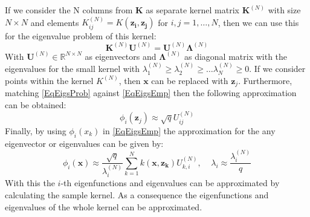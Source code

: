 If we consider the N columns from $\mathbf{K}$ as separate kernel matrix $\mathbf{K}^{(N)}$ with size $N\times N$ and elements $K_{ij}^{(N)}=K(\mathbf{z_i,z_j})$ for $i,j=1,\dots,N$, then we can use this for the eigenvalue problem of this kernel:\cite{Williams.2000}
\begin{equation}\label{EqEigsProb}
	\mathbf{K}^{(N)}\mathbf{U}^{(N)} = \mathbf{U}^{(N)}\mathbf{\Lambda}^{(N)}
\end{equation} 
With $\mathbf{U}^{(N)} \in \mathbb{R}^{N\times N}$ as eigenvectors and $\boldsymbol{\Lambda}^{(N)}$ as diagonal matrix with the eigenvalues for the small kernel with $\lambda_1^{(N)}\ge\lambda_2^{(N)}\ge\dots\lambda_N^{(N)} \ge0$.
If we consider points within the kernel $K^{(N)}$, then $\mathbf{x}$ can be replaced with $\mathbf{z}_j$.
Furthermore, matching \eqref{EqEigsProb} against \eqref{EqEigsEmp} then the following approximation can be obtained:\cite{Williams.2000}
\begin{equation}\label{EqEigsFuncAprox}
	\phi_i(\mathbf{z}_j) \approx \sqrt{q}U_{ij}^{(N)}
\end{equation}
Finally, by using $\phi_i(x_k)$ in \eqref{EqEigsEmp} the approximation for the any eigenvector or eigenvalues can be given by:
\begin{equation}\label{EqEigsValAprox}
	\phi_i(\mathbf{x})\approx\frac{\sqrt{q}}{\lambda_i^{(N)}}\sum_{k=1}^{N}k(\mathbf{x},\mathbf{z_k})U_{k,i}^{(N)}, \>\>\>\>\> \lambda_i \approx \frac{\lambda_i^{(N)}}{q}
\end{equation}
With this the $i$-th eigenfunctions and eigenvalues can be approximated by calculating the sample kernel.\cite{Williams.2000}
As a consequence the eigenfunctions and eigenvalues of the whole kernel can be approximated.
